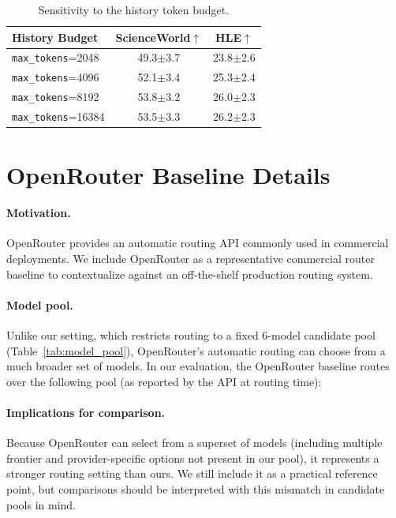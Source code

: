 \begin{table}[!htbp]
\centering
\small
\setlength{\tabcolsep}{6pt}
\begin{tabular}{lcc}
\toprule
History Budget & ScienceWorld$\uparrow$ & HLE$\uparrow$ \\
\midrule
\texttt{max\_tokens}=2048  & 49.3$\pm$3.7 & 23.8$\pm$2.6 \\
\texttt{max\_tokens}=4096  & 52.1$\pm$3.4 & 25.3$\pm$2.4 \\
\texttt{max\_tokens}=8192  & 53.8$\pm$3.2 & 26.0$\pm$2.3 \\
\texttt{max\_tokens}=16384 & 53.5$\pm$3.3 & 26.2$\pm$2.3 \\
\bottomrule
\end{tabular}
\caption{Sensitivity to the history token budget.}
\label{tab:history_budget}
\end{table}

\section{OpenRouter Baseline Details}
\label{app:openrouter}

\paragraph{Motivation.}
OpenRouter \citep{openrouter} provides an automatic routing API commonly used in commercial deployments.
We include OpenRouter as a representative commercial router baseline to contextualize \method against an off-the-shelf production routing system.

\paragraph{Model pool.}
Unlike our setting, which restricts routing to a fixed 6-model candidate pool (Table~\ref{tab:model_pool}), OpenRouter's automatic routing can choose from a much broader set of models.
In our evaluation, the OpenRouter baseline routes over the following pool (as reported by the API at routing time):



\paragraph{Implications for comparison.}
Because OpenRouter can select from a superset of models (including multiple frontier and provider-specific options not present in our pool), it represents a stronger routing setting than ours.
We still include it as a practical reference point, but comparisons should be interpreted with this mismatch in candidate pools in mind.

